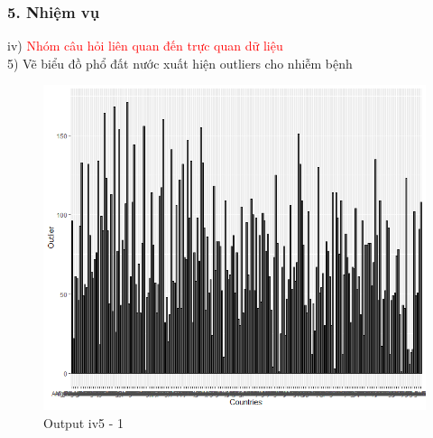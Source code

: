 \documentclass[english,10pt,table]{beamer}
\begin{document}
\begin{frame}[fragile]
\frametitle{5.  Nhiệm vụ}
	iv) \textcolor{red}{Nhóm câu hỏi liên quan đến trực quan dữ liệu}\\%
    5) Vẽ biểu đồ phổ đất nước xuất hiện outliers cho nhiễm bệnh
	\begin{figure}[h!]
	\begin{center}
		    \includegraphics[scale = 0.4]{Images/IV/iv (5) - 1.png}
		     \caption{Output iv5 - 1}
		\end{center}
		\end{figure}
\end{frame}
\end{document}
